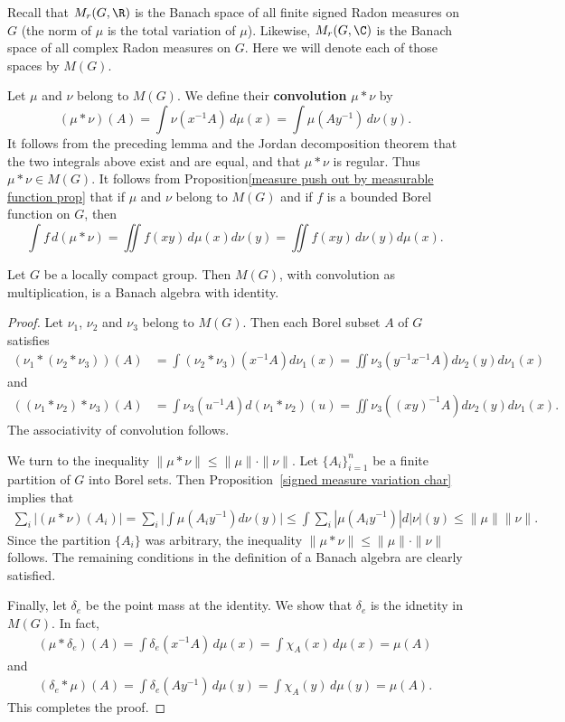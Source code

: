 Recall that $M_r(G,\R)$ is the Banach space of all finite signed Radon measures on $G$ (the norm of $\mu$ is the total variation of $\mu$). Likewise, $M_r(G,\C)$ is the Banach space of all complex Radon measures on $G$. Here we will denote each of those spaces by $M(G)$.\par
Let $\mu$ and $\nu$ belong to $M(G)$. We define their \textbf{convolution} $\mu\ast\nu$ by
\[(\mu\ast\nu)(A)=\int\nu(x^{-1}A)\,d\mu(x)=\int\mu(Ay^{-1})\,d\nu(y).\]
It follows from the preceding lemma and the Jordan decomposition theorem that the two integrals above exist and are equal, and that $\mu\ast\nu$ is regular. Thus $\mu\ast\nu\in M(G)$. It follows from Proposition\ref{measure push out by measurable function prop} that if $\mu$ and $\nu$ belong to $M(G)$ and if $f$ is a bounded Borel function on $G$, then
\[\int f\,d(\mu\ast\nu)=\iint f(xy)\,d\mu(x)d\nu(y)=\iint f(xy)\,d\nu(y)d\mu(x).\]
\begin{proposition}
Let $G$ be a locally compact group. Then $M(G)$, with convolution as multiplication, is a Banach algebra with identity.
\end{proposition}
\begin{proof}
Let $\nu_1$, $\nu_2$ and $\nu_3$ belong to $M(G)$. Then each Borel subset $A$ of $G$ satisfies
\begin{align*}
(\nu_1\ast(\nu_2\ast\nu_3))(A)&=\int(\nu_2\ast\nu_3)(x^{-1}A)d\nu_1(x)=\iint\nu_3(y^{-1}x^{-1}A)d\nu_2(y)d\nu_1(x)
\end{align*}
and
\begin{align*}
((\nu_1\ast\nu_2)\ast\nu_3)(A)&=\int\nu_3(u^{-1}A)d(\nu_1\ast\nu_2)(u)=\iint\nu_3((xy)^{-1}A)d\nu_2(y)d\nu_1(x).
\end{align*}
The associativity of convolution follows.\par
We turn to the inequality $\|\mu\ast\nu\|\leq\|\mu\|\cdot\|\nu\|$. Let $\{A_i\}_{i=1}^{n}$ be a finite partition of $G$ into Borel sets. Then Proposition~\ref{signed measure variation char} implies that
\begin{align*}
\sum_i|(\mu\ast\nu)(A_i)|=\sum_i\Big|\int\mu(A_iy^{-1})d\nu(y)\Big|\leq\int\sum_i|\mu(A_iy^{-1})|d|\nu|(y)\leq\|\mu\|\|\nu\|.
\end{align*}
Since the partition $\{A_i\}$ was arbitrary, the inequality $\|\mu\ast\nu\|\leq\|\mu\|\cdot\|\nu\|$ follows. The remaining conditions in the definition of a Banach algebra are clearly satisfied.\par
Finally, let $\delta_e$ be the point mass at the identity. We show that $\delta_e$ is the idnetity in $M(G)$. In fact,
\begin{align*}
(\mu\ast\delta_e)(A)=\int\delta_e(x^{-1}A)\,d\mu(x)=\int\chi_A(x)\,d\mu(x)=\mu(A)
\end{align*}
and
\begin{align*}
(\delta_e\ast\mu)(A)=\int\delta_e(Ay^{-1})\,d\mu(y)=\int\chi_A(y)\,d\mu(y)=\mu(A).
\end{align*}
This completes the proof.
\end{proof}
